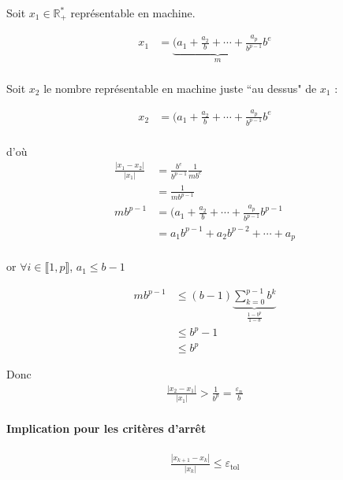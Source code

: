 \documentclass{article}
\newcommand{\R}{\mathbb{R}}
\renewcommand{\epsilon}{\varepsilon}
\begin{document}
\begin{example}
    Soit $x_1 \in \R_+^\ast$ représentable en machine.

    \begin{align*}
        x_1 &= \underbrace{(a_1 + \frac{a_2}{b} + \cdots + \frac{a_p}{b^{p-1}}}_{m} b^{e} \\
    \end{align*}

    Soit $x_2$ le nombre représentable en machine juste ``au dessus" de $x_1$ :

    \begin{align*}
        x_2 &= (a_1 + \frac{a_2}{b} + \cdots + \frac{a_p}{b^{p-1}} b^{e} \\
    \end{align*}

    d'où
    \begin{align*}
        \frac{|x_1 - x_2|}{|x_1|} &= \frac{b^{e}}{b^{p-1}} \frac{1}{m b^{e}} \\
        &= \frac{1}{m b^{p-1}} \\
        m b^{p-1} &= (a_1 + \frac{a_2}{b} + \cdots + \frac{a_p}{b^{p-1}} b^{p-1} \\
        &= a_1 b^{p-1} + a_2 b^{p-2} + \cdots + a_p \\
    \end{align*}

    or $\forall i \in \llbracket 1, p \rrbracket$, $a_1\le b-1$

    \begin{align*}
        mb^{p-1} &\le (b-1) \underbrace{\sum_{k=0}^{p-1} b^{k}}_{\frac{1-b^{p}}{1-b}} \\
                 &\le b^{p} - 1 \\
                 &\le b^{p}
    \end{align*}

    Donc \begin{align*}
        \frac{|x_2 - x_1|}{|x_1|} > \frac{1}{b^{p}} = \frac{\epsilon_n}{b}
    \end{align*}

\paragraph{Implication pour les critères d'arrêt}

\begin{align*}
    \frac{|x_{k+1} - x_k|}{|x_k|} \le \epsilon_{\text{tol}}
\end{align*}


\end{example}
\end{document}
